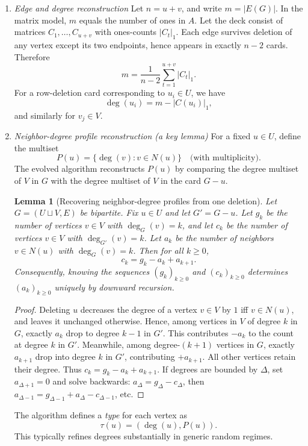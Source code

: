 \documentclass[11pt]{amsart}
\newtheorem{lemma}{Lemma}
\begin{document}
\begin{enumerate}
    \item \emph{Edge and degree reconstruction}
Let $n=u+v$, and write $m=|E(G)|$.
In the matrix model, $m$ equals the number of ones in $A$.
Let the deck consist of matrices $C_1,\dots,C_{u+v}$ with ones-counts $|C_t|_1$.
Each edge survives deletion of any vertex except its two endpoints, hence appears in exactly $n-2$ cards. Therefore
\[
m = \frac{1}{n-2}\sum_{t=1}^{u+v} |C_t|_1.
\]
For a row-deletion card corresponding to $u_i\in U$, we have
\[
\deg(u_i) = m - |C(u_i)|_1,
\]
and similarly for $v_j\in V$.

\item \emph{Neighbor-degree profile reconstruction (a key lemma)}
For a fixed $u\in U$, define the multiset
\[
P(u) = \{\deg(v) : v\in N(u)\}\quad\text{(with multiplicity)}.
\]
The evolved algorithm reconstructs $P(u)$ by comparing the degree multiset of $V$ in $G$ with the degree multiset of $V$ in the card $G-u$.

\begin{lemma}[Recovering neighbor-degree profiles from one deletion]\label{lem:profile}
Let $G=(U\sqcup V,E)$ be bipartite. Fix $u\in U$ and let $G' = G-u$.
Let $g_k$ be the number of vertices $v\in V$ with $\deg_G(v)=k$, and let $c_k$ be the number of vertices $v\in V$ with $\deg_{G'}(v)=k$.
Let $a_k$ be the number of neighbors $v\in N(u)$ with $\deg_G(v)=k$.
Then for all $k\ge 0$,
\[
c_k = g_k - a_k + a_{k+1}.
\]
Consequently, knowing the sequences $(g_k)_{k\ge 0}$ and $(c_k)_{k\ge 0}$ determines $(a_k)_{k\ge 0}$ uniquely by downward recursion.
\end{lemma}

\begin{proof}
Deleting $u$ decreases the degree of a vertex $v\in V$ by $1$ iff $v\in N(u)$, and leaves it unchanged otherwise.
Hence, among vertices in $V$ of degree $k$ in $G$, exactly $a_k$ drop to degree $k-1$ in $G'$. This contributes $-a_k$ to the count at degree $k$ in $G'$.
Meanwhile, among degree-$(k+1)$ vertices in $G$, exactly $a_{k+1}$ drop into degree $k$ in $G'$, contributing $+a_{k+1}$.
All other vertices retain their degree. Thus $c_k = g_k - a_k + a_{k+1}$.
If degrees are bounded by $\Delta$, set $a_{\Delta+1}=0$ and solve backwards:
$a_\Delta = g_\Delta - c_\Delta$, then $a_{\Delta-1}= g_{\Delta-1}+a_\Delta - c_{\Delta-1}$, etc.
\end{proof}

The algorithm defines a \emph{type} for each vertex as
\[
\tau(u) = (\deg(u), P(u)).
\]
This typically refines degrees substantially in generic random regimes.


\end{enumerate}
\end{document}
